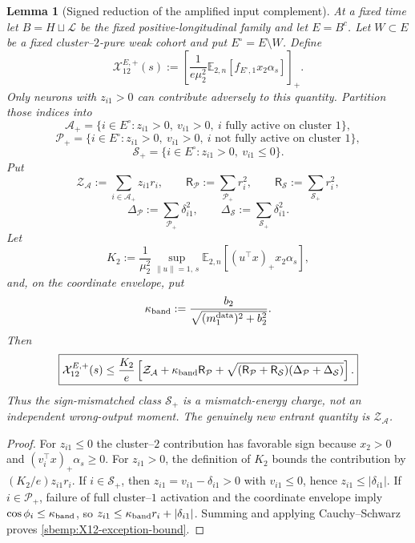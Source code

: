 \documentclass{article} %
\theoremstyle{plain}
\newtheorem{lemma}[theorem]{Lemma}
\theoremstyle{definition}
\theoremstyle{remark}
\begin{document}
\begin{lemma}[Signed reduction of the amplified input complement]
\label{sbemp:signed-input-complement}
At a fixed time let $B=H\sqcup\mathcal L$ be the fixed positive-longitudinal
family and let $E=B^c$.  Let $W\subset E$ be a fixed cluster--$2$-pure weak
cohort and put $E^\circ=E\setminus W$.  Define
\[
 \mathcal X_{12}^{E,+}(s)
 :=\left[
 \frac{1}{e\mu_2^2}
 \mathbb E_{2,n}[f_{E^\circ,1}x_2\alpha_s]
 \right]_+.
\]
Only neurons with $z_{i1}>0$ can contribute adversely to this quantity.
Partition those indices into
\[
 \mathcal A_+
 =\{i\in E^\circ:z_{i1}>0,\ v_{i1}>0,
       \ i\text{ fully active on cluster }1\},
\]
\[
 \mathcal P_+
 =\{i\in E^\circ:z_{i1}>0,\ v_{i1}>0,
       \ i\text{ not fully active on cluster }1\},
\]
\[
 \mathcal S_+
 =\{i\in E^\circ:z_{i1}>0,\ v_{i1}\le0\}.
\]
Put
\[
 \mathcal Z_{\mathcal A}:=\sum_{i\in\mathcal A_+}z_{i1}r_i,
 \qquad
 \mathsf R_{\mathcal P}:=\sum_{\mathcal P_+}r_i^2,
 \qquad
 \mathsf R_{\mathcal S}:=\sum_{\mathcal S_+}r_i^2,
\]
\[
 \Delta_{\mathcal P}:=\sum_{\mathcal P_+}\delta_{i1}^2,
 \qquad
 \Delta_{\mathcal S}:=\sum_{\mathcal S_+}\delta_{i1}^2.
\]
Let
\[
 K_2
 :=\frac{1}{\mu_2^2}
 \sup_{\|u\|=1,\,s}
 \mathbb E_{2,n}[(u^\top x)_+x_2\alpha_s],
\]
and, on the coordinate envelope, put
\[
 \kappa_{\rm band}
 :=\frac{b_2}{\sqrt{(m_1^{\rm data})^2+b_2^2}}.
\]
Then
\begin{equation}\label{sbemp:X12-exception-bound}
 \boxed{
 \mathcal X_{12}^{E,+}(s)
 \le\frac{K_2}{e}\left[
 \mathcal Z_{\mathcal A}
 +\kappa_{\rm band}\mathsf R_{\mathcal P}
 +\sqrt{(\mathsf R_{\mathcal P}+\mathsf R_{\mathcal S})
              (\Delta_{\mathcal P}+\Delta_{\mathcal S})}
 \right].
 }
\end{equation}
Thus the sign-mismatched class $\mathcal S_+$ is a mismatch-energy charge,
not an independent wrong-output moment.  The genuinely new entrant quantity
is $\mathcal Z_{\mathcal A}$.
\end{lemma}
\begin{proof}
For $z_{i1}\le0$ the cluster--$2$ contribution has favorable sign because
$x_2>0$ and $(v_i^\top x)_+\alpha_s\ge0$.  For $z_{i1}>0$, the definition of
$K_2$ bounds the contribution by $(K_2/e)z_{i1}r_i$.
If $i\in\mathcal S_+$, then
$z_{i1}=v_{i1}-\delta_{i1}>0$ with $v_{i1}\le0$, hence
$z_{i1}\le|\delta_{i1}|$.  If $i\in\mathcal P_+$, failure of full
cluster--$1$ activation and the coordinate envelope imply
$\cos\phi_i\le\kappa_{\rm band}$, so
$z_{i1}\le\kappa_{\rm band}r_i+|\delta_{i1}|$.
Summing and applying Cauchy--Schwarz proves
\eqref{sbemp:X12-exception-bound}.
\end{proof}
\end{document}

